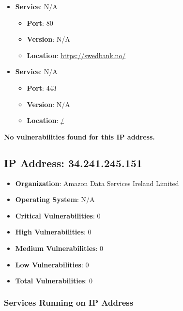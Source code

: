 \documentclass{article}
\begin{document}
\begin{itemize}
    
        \item \textbf{Service}: N/A
        \begin{itemize}
            \item \textbf{Port}: 80
            \item \textbf{Version}:  N/A 
            \item \textbf{Location}: \href{ https://swedbank.no/ }{ https://swedbank.no/ }
        \end{itemize}
    
        \item \textbf{Service}: N/A
        \begin{itemize}
            \item \textbf{Port}: 443
            \item \textbf{Version}:  N/A 
            \item \textbf{Location}: \href{ / }{ / }
        \end{itemize}
    
\end{itemize}


\textbf{No vulnerabilities found for this IP address.}




\clearpage



\subsection{IP Address: 34.241.245.151}

\begin{itemize}
    \item \textbf{Organization}: Amazon Data Services Ireland Limited
    \item \textbf{Operating System}:  N/A 
    \item \textbf{Critical Vulnerabilities}: 0
    \item \textbf{High Vulnerabilities}: 0
    \item \textbf{Medium Vulnerabilities}: 0
    \item \textbf{Low Vulnerabilities}: 0
    \item \textbf{Total Vulnerabilities}: 0
\end{itemize}

\subsubsection*{Services Running on IP Address}
\end{document}
